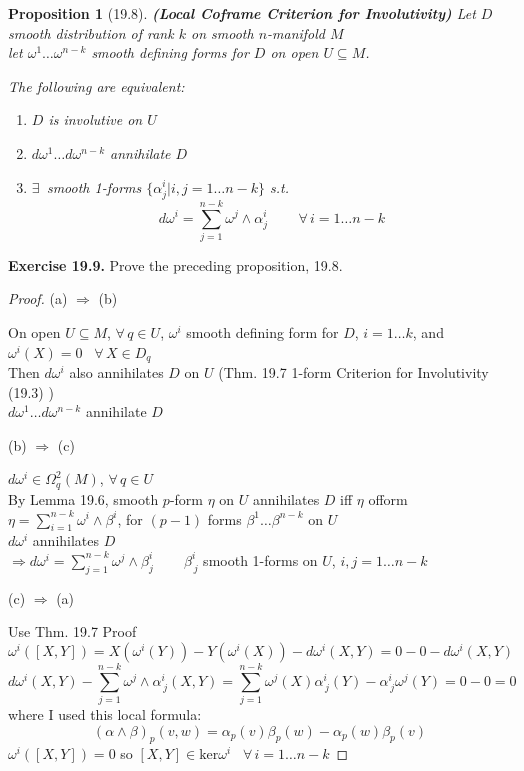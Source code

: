 \documentclass[11pt]{amsart}
\newtheorem{proposition}{Proposition}
\theoremstyle{definition}
\newcommand{\exercisehead}[1]{\medskip\noindent\textbf{Exercise #1.} }
\begin{document}
\begin{proposition}[19.8] \textbf{(Local Coframe Criterion for Involutivity)}
  Let $D$ smooth distribution of rank $k$ on smooth $n$-manifold $M$ \\
let $\omega^1 \dots \omega^{n-k}$ smooth defining forms for $D$ on open $U \subseteq M$.

The following are equivalent:
\begin{enumerate}
\item[(a)] $D$ is involutive on $U$
\item[(b)] $d\omega^1 \dots d\omega^{n-k}$ annihilate $D$
\item[(c)] $\exists \, $ smooth 1-forms $\lbrace \alpha^i_j | i, j =1 \dots n-k \rbrace$ s.t.
\[
d\omega^i = \sum_{j=1}^{n-k} \omega^j \wedge \alpha^i_j \quad \quad \, \forall \, i = 1 \dots n-k
\]
\end{enumerate}
\end{proposition}

\exercisehead{19.9} Prove the preceding proposition, 19.8.

\begin{proof}
(a) $\Longrightarrow$ (b)

On open $U\subseteq M$, $\forall \, q \in U$, $\omega^i$ smooth defining form for $D$, $i=1\dots k$, and $\omega^i(X) = 0$ \, $\forall \, X \in D_q$  \\
\phantom{ On open } Then $d\omega^i$ also annihilates $D$ on $U$ (Thm. 19.7 1-form Criterion for Involutivity (19.3) ) \\
$d\omega^1 \dots d\omega^{n-k}$ annihilate $D$

(b) $\Longrightarrow $ (c)

$d\omega^i \in \Omega^2_q(M)$, $\forall \, q \in U$ \\
By Lemma 19.6, smooth $p$-form $\eta$ on $U$ annihilates $D$ iff $\eta$ ofform $\eta = \sum_{i=1}^{n-k} \omega^i\wedge \beta^i$, for $(p-1)$ forms $\beta^1 \dots \beta^{n-k}$ on $U$ \\
$d\omega^i$ annihilates $D$ \\
\phantom{\quad \, } $\Longrightarrow d\omega^i = \sum_{j=1}^{n-k} \omega^j \wedge \beta_j^i \quad \quad \, \beta^i_{ \, j} $ smooth 1-forms on $U$, $i,j=1\dots n-k$

(c) $\Longrightarrow $ (a)

Use Thm. 19.7 Proof
\[
\omega^i([X,Y]) = X(\omega^i(Y)) - Y(\omega^i(X)) - d\omega^i(X,Y)  = 0 -0 - d\omega^i(X,Y)
\]
\[
d\omega^i(X,Y) - \sum_{j=1}^{n-k} \omega^j \wedge \alpha^i_{ \, j}(X,Y) = \sum_{j=1}^{n-k} \omega^j(X) \alpha^i_{ \, j }(Y) - \alpha^i_{ \, j}\omega^j(Y) = 0 - 0 = 0
\]
where I used this local formula:
\[
(\alpha \wedge \beta)_p(v,w) = \alpha_p(v) \beta_p(w) - \alpha_p(w) \beta_p(v)
\]
$\omega^i([X,Y]) = 0$ so $[X,Y] \in \text{ker}\omega^i$ \quad \, $\forall \, i = 1 \dots n-k$

\end{proof}
\end{document}
